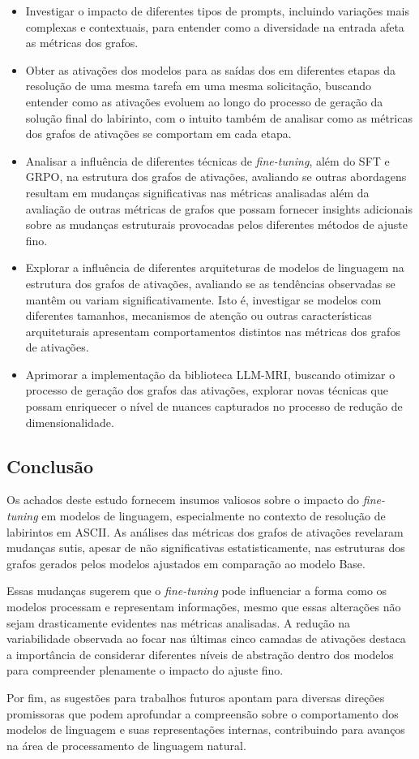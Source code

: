 \begin{itemize}
    \item Investigar o impacto de diferentes tipos de prompts, incluindo variações mais complexas e contextuais, para entender como a diversidade na entrada afeta as métricas dos grafos.
    \item Obter as ativações dos modelos para as saídas dos em diferentes etapas da resolução de uma mesma tarefa em uma mesma solicitação, buscando entender como as ativações evoluem ao longo do processo de geração da solução final do labirinto, com o intuito também de analisar como as métricas dos grafos de ativações se comportam em cada etapa.
    \item Analisar a influência de diferentes técnicas de \textit{fine-tuning}, além do SFT e GRPO, na estrutura dos grafos de ativações, avaliando se outras abordagens resultam em mudanças significativas nas métricas analisadas além da avaliação de outras métricas de grafos que possam fornecer insights adicionais sobre as mudanças estruturais provocadas pelos diferentes métodos de ajuste fino.
    \item Explorar a influência de diferentes arquiteturas de modelos de linguagem na estrutura dos grafos de ativações, avaliando se as tendências observadas se mantêm ou variam significativamente. Isto é, investigar se modelos com diferentes tamanhos, mecanismos de atenção ou outras características arquiteturais apresentam comportamentos distintos nas métricas dos grafos de ativações.
    \item Aprimorar a implementação da biblioteca LLM-MRI, buscando otimizar o processo de geração dos grafos das ativações, explorar novas técnicas que possam enriquecer o nível de nuances capturados no processo de redução de dimensionalidade.
\end{itemize}

\subsection{Conclusão}

Os achados deste estudo fornecem insumos valiosos sobre o impacto do \textit{fine-tuning} em modelos de linguagem, especialmente no contexto de resolução de labirintos em ASCII. As análises das métricas dos grafos de ativações revelaram mudanças sutis, apesar de não significativas estatisticamente, nas estruturas dos grafos gerados pelos modelos ajustados em comparação ao modelo Base.

Essas mudanças sugerem que o \textit{fine-tuning} pode influenciar a forma como os modelos processam e representam informações, mesmo que essas alterações não sejam drasticamente evidentes nas métricas analisadas. A redução na variabilidade observada ao focar nas últimas cinco camadas de ativações destaca a importância de considerar diferentes níveis de abstração dentro dos modelos para compreender plenamente o impacto do ajuste fino.

Por fim, as sugestões para trabalhos futuros apontam para diversas direções promissoras que podem aprofundar a compreensão sobre o comportamento dos modelos de linguagem e suas representações internas, contribuindo para avanços na área de processamento de linguagem natural.